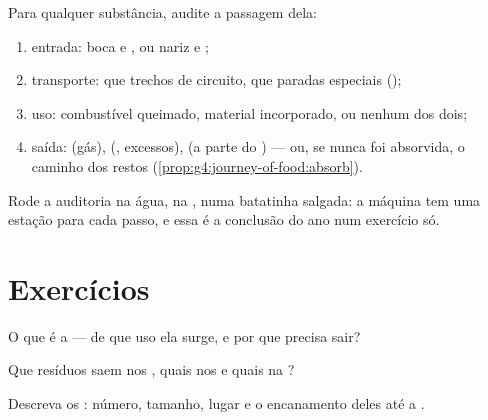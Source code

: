 \begin{method}\label{met:g7:removing-wastes:audit}
Para qualquer substância, audite a passagem dela:
\begin{enumerate}
  \item entrada: boca e , ou nariz e ;
  \item transporte: que trechos de circuito, que paradas especiais
        ();
  \item uso: combustível queimado, material incorporado, ou nenhum
        dos dois;
  \item saída:  (gás),  (, excessos),  (a parte
        do ) --- ou, se nunca foi absorvida, o caminho dos restos
        (\cref{prop:g4:journey-of-food:absorb}).
\end{enumerate}
Rode a auditoria na água, na , numa batatinha salgada: a
máquina tem uma estação para cada passo, e essa é a conclusão do ano
num exercício só.
\end{method}

\section{Exercícios}

\begin{exercise}[$\star$]\label{exo:g7:removing-wastes:1}
O que é a  --- de que uso ela surge, e por que precisa sair?
\end{exercise}

\begin{exercise}[$\star$]\label{exo:g7:removing-wastes:2}
Que resíduos saem nos , quais nos  e quais na ?
\end{exercise}

\begin{exercise}[$\star$]\label{exo:g7:removing-wastes:3}
Descreva os : número, tamanho, lugar e o encanamento deles até a
.
\end{exercise}

